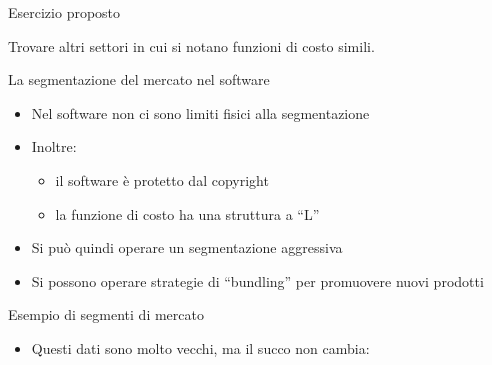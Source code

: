 \documentclass{beamer}
\begin{document}
\begin{frame}
{\centerline{Esercizio proposto}}
\vspace{1cm}
\begin{center}
    \LARGE{Trovare altri settori in cui si notano funzioni di costo simili.}
\end{center}

\end{frame}


\begin{frame}
{\centerline{La segmentazione del mercato nel software}}
\begin{itemize}
\item Nel software non ci sono limiti fisici alla segmentazione
\item Inoltre:
\begin{itemize}
\item il software \`{e} protetto dal copyright
\item la funzione di costo ha una struttura a ``L''
\end{itemize}
\item Si pu\`{o} quindi operare un segmentazione aggressiva
\item Si possono operare strategie di ``bundling'' per promuovere nuovi prodotti
\end{itemize}

\end{frame}

\begin{frame}
{\centerline{Esempio di segmenti di mercato}}

\begin{itemize}
    \item Questi dati sono molto vecchi, ma il succo non cambia:
\end{itemize}

\begin{center}
    
\end{center}
\end{frame}
\end{document}

